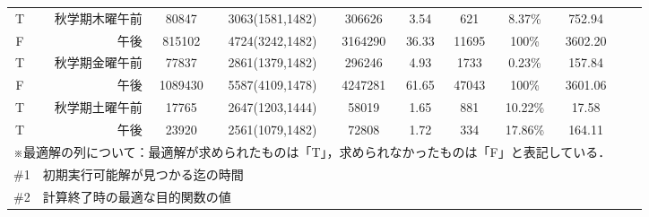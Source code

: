 \documentclass[12pt, a4paper, fleqn]{jreport}
\begin{document}
\begin{table}[H]
\begin{center}
{\begin{tabular}{cr|ccccccccc}
T&秋学期木曜午前 & 80847 & 3063(1581,1482) & 306626 & 3.54 & 621 & 8.37\% & 752.94 \\
F&午後 & 815102 & 4724(3242,1482) & 3164290 & 36.33 & 11695 & 100\% & 3602.20 \\
T&秋学期金曜午前 & 77837 & 2861(1379,1482) & 296246 & 4.93 & 1733 & 0.23\% & 157.84 \\
F&午後 & 1089430 & 5587(4109,1478) & 4247281 & 61.65 & 47043 & 100\% & 3601.06 \\
T&秋学期土曜午前 & 17765 & 2647(1203,1444) & 58019 & 1.65 & 881 & 10.22\% & 17.58 \\
T&午後 & 23920 & 2561(1079,1482) & 72808 & 1.72 & 334 & 17.86\% & 164.11 \\
\hline
\multicolumn{9}{l}{※最適解の列について：最適解が求められたものは「T」，求められなかったものは「F」と表記している．}\\
\multicolumn{9}{l}{\#1　初期実行可能解が見つかる迄の時間}\\
\multicolumn{9}{l}{\#2　計算終了時の最適な目的関数の値}\\
 \end{tabular}
}
\end{center}
\end{table}
\fi
\end{document}
